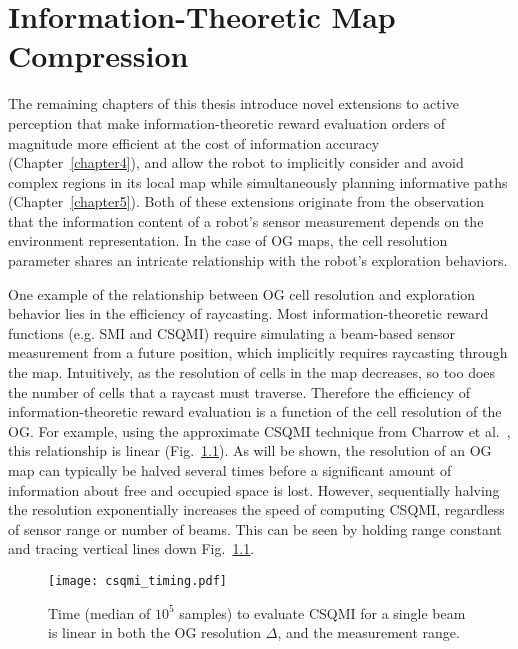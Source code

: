 \chapter{Information-Theoretic Map Compression}
\label{chapter3}

The remaining chapters of this thesis introduce novel extensions to active perception
that make information-theoretic reward evaluation orders of magnitude more
efficient at the cost of information accuracy (Chapter~\ref{chapter4}), and allow the
robot to implicitly consider and avoid complex regions
in its local map while simultaneously planning informative paths (Chapter~\ref{chapter5}). Both
of these extensions originate from the observation that the information content
of a robot's sensor measurement depends on the environment
representation. In the case of OG maps, the cell resolution parameter shares an
intricate relationship with the robot's exploration behaviors.

One example of the relationship between OG cell resolution and exploration
behavior lies in the efficiency of raycasting. Most information-theoretic reward
functions (e.g. SMI and CSQMI) require simulating a beam-based sensor measurement from a future
position, which implicitly requires raycasting through the map. Intuitively, as
the resolution of cells in the map decreases, so too does the number of cells
that a raycast must traverse. Therefore the efficiency of information-theoretic reward evaluation
is a function of the cell resolution of the OG. For example, using the approximate
CSQMI technique from Charrow et al.~\cite{charrow2015icra}, this relationship is linear
(Fig.~\ref{fig:csqmi_timing}). As will be shown, the resolution of an OG map can typically be halved several
times before a significant amount of information about free and occupied space
is lost. However, sequentially halving the resolution exponentially increases the
speed of computing CSQMI, regardless of sensor range or number of beams. This
can be seen by holding range constant and tracing vertical lines down Fig.~\ref{fig:csqmi_timing}.

\begin{figure}
  \centering
  \texttt{[image: csqmi\_timing.pdf]}
  \caption[Time complexity of computing CSQMI for a varying map resolution.]{Time (median of $10^5$ samples) to evaluate CSQMI for a
    single beam is linear in both the OG resolution $\Delta$, and
  the measurement range. \label{fig:csqmi_timing}}
\end{figure}

